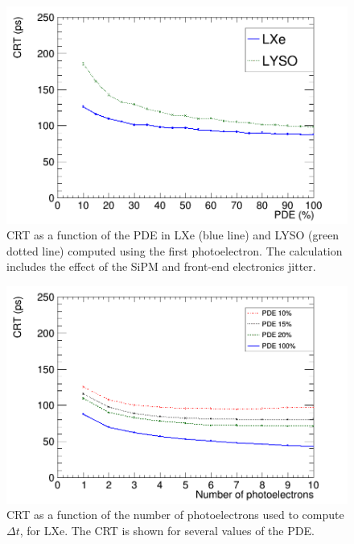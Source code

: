 \documentclass[review]{elsarticle}
\begin{document}
 \begin{figure}[!bhtp]
	\centering
	\includegraphics[scale=0.30]{../img/PetaloTOF/CTR_jitter_phys.png}
	\caption{\label{fig.crt3} CRT as a function of the PDE in LXe (blue line) and LYSO (green dotted line) computed using the first photoelectron. The calculation includes the effect of the SiPM  and front-end electronics jitter.}
\end{figure}

 \begin{figure}[!bhtp]
	\centering
	\includegraphics[scale=0.30]{../img/PetaloTOF/lxe_noCher_avg_npe_phys.png}
	\caption{\label{fig.crt_avg_LXe} CRT as a function of the number of photoelectrons used to compute $\Delta t$, for LXe. The CRT is shown for several values of the PDE.}
\end{figure}
\end{document}
